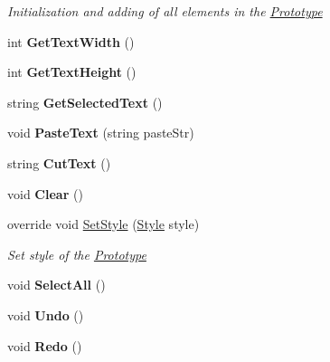 \begin{DoxyCompactItemize}
\begin{DoxyCompactList}\small\item\em Initialization and adding of all elements in the \mbox{\hyperlink{class_space_v_i_l_1_1_prototype}{Prototype}} \end{DoxyCompactList}\item 
\mbox{\label{class_space_v_i_l_1_1_text_edit_ab3e6d3c87badb11c014288064bfe74b5}} 
int {\bfseries Get\+Text\+Width} ()
\item 
\mbox{\label{class_space_v_i_l_1_1_text_edit_a8fa34c4f7908b091eeacd94390343a61}} 
int {\bfseries Get\+Text\+Height} ()
\item 
\mbox{\label{class_space_v_i_l_1_1_text_edit_a038e5e4f0a26d1e6e60b130c33d1475e}} 
string {\bfseries Get\+Selected\+Text} ()
\item 
\mbox{\label{class_space_v_i_l_1_1_text_edit_ae77d47ae0954c456f39b653a65774d95}} 
void {\bfseries Paste\+Text} (string paste\+Str)
\item 
\mbox{\label{class_space_v_i_l_1_1_text_edit_ac1255a3e141988bb0c072b81b07a70ff}} 
string {\bfseries Cut\+Text} ()
\item 
\mbox{\label{class_space_v_i_l_1_1_text_edit_a80eff22d41fea8bd8f33bf6104d5a3c0}} 
void {\bfseries Clear} ()
\item 
override void \mbox{\hyperlink{class_space_v_i_l_1_1_text_edit_ac587be091aa4d1525dfcec90d6105073}{Set\+Style}} (\mbox{\hyperlink{class_space_v_i_l_1_1_decorations_1_1_style}{Style}} style)
\begin{DoxyCompactList}\small\item\em Set style of the \mbox{\hyperlink{class_space_v_i_l_1_1_prototype}{Prototype}} \end{DoxyCompactList}\item 
\mbox{\label{class_space_v_i_l_1_1_text_edit_aa7ae050e3de8833c92778dd72472f6ae}} 
void {\bfseries Select\+All} ()
\item 
\mbox{\label{class_space_v_i_l_1_1_text_edit_a0e206c2f3a49d34b9760647ee1b06e72}} 
void {\bfseries Undo} ()
\item 
\mbox{\label{class_space_v_i_l_1_1_text_edit_aceaa334f5a9cb74631d87d68cb53314c}} 
void {\bfseries Redo} ()
\end{DoxyCompactItemize}
